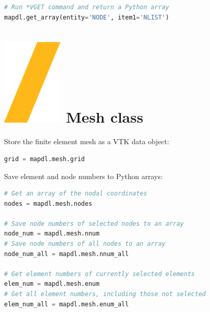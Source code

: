 \documentclass[9pt,landscape]{article}
\begin{document}
\begin{multicols}{3}
\begin{lstlisting}[language=Python]
# Run *VGET command and return a Python array
mapdl.get_array(entity='NODE', item1='NLIST')
\end{lstlisting} 

\section{\includegraphics[height=\fontcharht\font`\S]{slash.png} Mesh class}
Store the finite element mesh as a VTK  data object:
\begin{lstlisting}[language=Python]
grid = mapdl.mesh.grid
\end{lstlisting} 

Save element and node numbers to Python arrays:
\begin{lstlisting}[language=Python]
# Get an array of the nodal coordinates
nodes = mapdl.mesh.nodes

# Save node numbers of selected nodes to an array
node_num = mapdl.mesh.nnum
# Save node numbers of all nodes to an array
node_num_all = mapdl.mesh.nnum_all

# Get element numbers of currently selected elements
elem_num = mapdl.mesh.enum
# Get all element numbers, including those not selected
elem_num_all = mapdl.mesh.enum_all
\end{lstlisting} 
\vfill

\columnbreak


\end{multicols}
\end{document}
